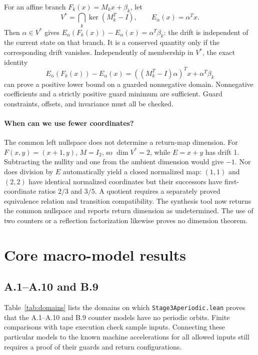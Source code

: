 \documentclass[11pt]{article}
\DeclareRobustCommand{\_}{\ifmmode\sb\else\textunderscore\allowbreak\fi}
\theoremstyle{definition}
\theoremstyle{remark}
\begin{document}
For an affine branch $F_k(x)=M_kx+\beta_k$, let
\[
V^*=\bigcap_k\ker(M_k^T-I),\qquad E_\alpha(x)=\alpha^Tx.
\]
Then $\alpha\in V^*$ gives $E_\alpha(F_k(x))-E_\alpha(x)=\alpha^T\beta_k$: the drift is independent of the current state on that branch. It is a conserved quantity only if the corresponding drift vanishes. Independently of membership in $V^*$, the exact identity
\[
E_\alpha(F_k(x))-E_\alpha(x)
=((M_k^T-I)\alpha)^Tx+\alpha^T\beta_k
\]
can prove a positive lower bound on a guarded nonnegative domain. Nonnegative coefficients and a strictly positive guard minimum are sufficient. Guard constraints, offsets, and invariance must all be checked.

\paragraph{When can we use fewer coordinates?}
The common left nullspace does not determine a return-map dimension. For $F(x,y)=(x+1,y)$, $M=I_2$, so $\dim V^*=2$, while $E=x+y$ has drift 1. Subtracting the nullity and one from the ambient dimension would give $-1$. Nor does division by $E$ automatically yield a closed normalized map: $(1,1)$ and $(2,2)$ have identical normalized coordinates but their successors have first-coordinate ratios $2/3$ and $3/5$. A quotient requires a separately proved equivalence relation and transition compatibility. The synthesis tool now returns the common nullspace and reports return dimension as undetermined. The use of two counters or a reflection factorization likewise proves no dimension theorem.

\section{Core macro-model results}
\label{sec:core}
\subsection{A.1--A.10 and B.9}
Table~\ref{tab:domains} lists the domains on which \texttt{Stage3Aperiodic.lean} proves that the A.1--A.10 and B.9 counter models have no periodic orbits. Finite comparisons with tape execution check sample inputs. Connecting these particular models to the known machine accelerations for all allowed inputs still requires a proof of their guards and return configurations.
\end{document}

